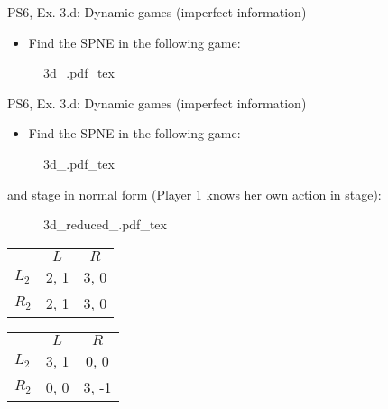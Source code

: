 \begin{frame}{PS6, Ex. 3.d: Dynamic games (imperfect information)}
    \begin{itemize}
      \item[(d)] Find the SPNE in the following game:
    \end{itemize}
    \begin{figure}[!h]
      \center
      \def\svgwidth{.8\columnwidth}
      {3d_.pdf_tex}
    \end{figure}
    \vfill\null
\end{frame}
\begin{frame}{PS6, Ex. 3.d: Dynamic games (imperfect information)}
    \begin{itemize}
      \item[(d)] Find the SPNE in the following game:
    \end{itemize}
    \vspace{-4pt}
    \begin{figure}[!h]
      \center
      \def\svgwidth{.8\columnwidth}
      {3d_.pdf_tex}
    \end{figure}
    \vspace{-4pt}
     and  stage in normal form (Player 1 knows her own action in  stage):
    \vspace{-4pt}
    \begin{figure}[!h]
      \center
      \def\svgwidth{.25\columnwidth}
      {3d_reduced_.pdf_tex}
    \end{figure}
    \vspace{-9pt}
    \begin{table}
      \begin{tabular}{l|c|c|}
        \multicolumn{1}{c}{} & \multicolumn{1}{c}{$L$} & \multicolumn{1}{c}{$R$} \\\cline{2-3}
        $L_2$ & 2, 1 & 3, 0 \\\cline{2-3}
        $R_2$ & 2, 1 & 3, 0 \\\cline{2-3}
      \end{tabular}
      \enskip
      \begin{tabular}{l|c|c|}
        \multicolumn{1}{c}{} & \multicolumn{1}{c}{$L$} & \multicolumn{1}{c}{$R$} \\\cline{2-3}
        $L_2$ & 3, 1 & 0, 0 \\\cline{2-3}
        $R_2$ & 0, 0 & 3, -1 \\\cline{2-3}
      \end{tabular}
    \end{table}
    \vfill\null
\end{frame}
